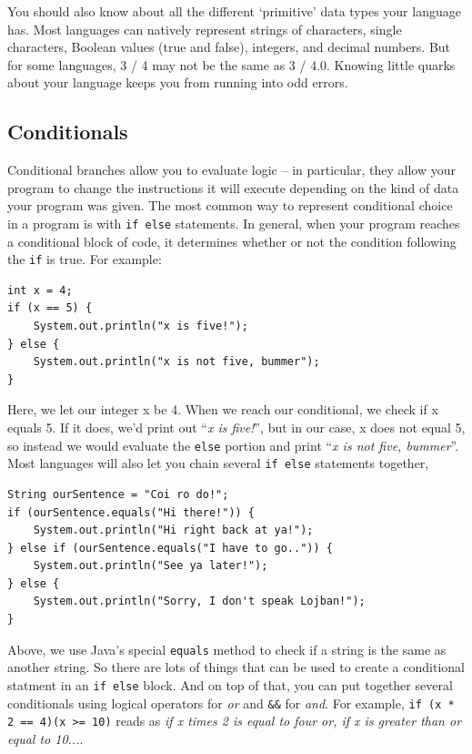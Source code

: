 \documentclass[a4paper]{article}
\begin{document}
You should also know about all the different `primitive' data types your language has. Most languages can natively represent strings of characters, single characters, Boolean values (true and false), integers, and decimal numbers. But for some languages, 3 / 4 may not be the same as 3 / 4.0. Knowing little quarks about your language keeps you from running into odd errors.

\subsection{Conditionals}
Conditional branches allow you to evaluate logic -- in particular, they allow your program to change the instructions it will execute depending on the kind of data your program was given. The most common way to represent conditional choice in a program is with \texttt{if else} statements. In general, when your program reaches a conditional block of code, it determines whether or not the condition following the \texttt{if} is true. For example:

\begin{lstlisting}
int x = 4;
if (x == 5) {
    System.out.println("x is five!");
} else {
    System.out.println("x is not five, bummer");
}
\end{lstlisting}

Here, we let our integer x be 4. When we reach our conditional, we check if x equals 5. If it does, we'd print out ``\textit{x is five!}'', but in our case, x does not equal 5, so instead we would evaluate the \texttt{else} portion and print ``\textit{x is not five, bummer}''. Most languages will also let you chain several \texttt{if else} statements together,

\begin{lstlisting}
String ourSentence = "Coi ro do!";
if (ourSentence.equals("Hi there!")) {
    System.out.println("Hi right back at ya!");
} else if (ourSentence.equals("I have to go..")) {
    System.out.println("See ya later!");
} else {
    System.out.println("Sorry, I don't speak Lojban!");
}
\end{lstlisting}

Above, we use Java's special \texttt{equals} method to check if a string is the same as another string. So there are lots of things that can be used to create a conditional statment in an \texttt{if else} block. And on top of that, you can put together several conditionals using logical operators \texttt{\textbar\textbar} for \textit{or} and \texttt{\&\&} for \textit{and}. For example, \texttt{if (x * 2 == 4)\textbar\textbar (x >= 10)} reads as \textit{if x times 2 is equal to four or, if x is greater than or equal to 10...}. 
\end{document}
